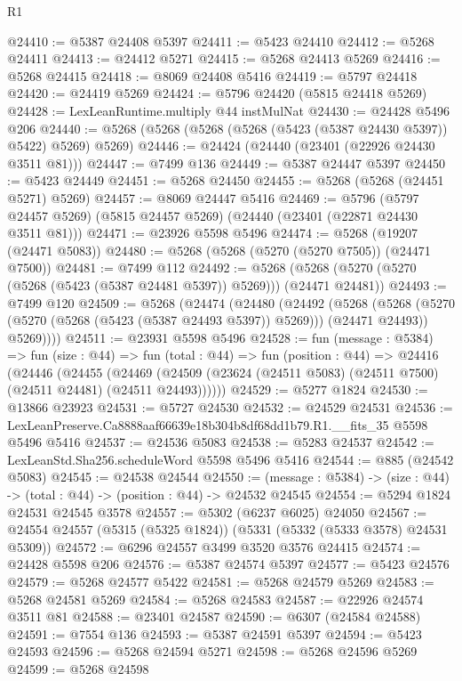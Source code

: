 \begin{lexlean}{R1}
\begin{coremodule}
@24410 := @5387 @24408 @5397
@24411 := @5423 @24410
@24412 := @5268 @24411
@24413 := @24412 @5271
@24415 := @5268 @24413 @5269
@24416 := @5268 @24415
@24418 := @8069 @24408 @5416
@24419 := @5797 @24418
@24420 := @24419 @5269
@24424 := @5796 @24420 (@5815 @24418 @5269)
@24428 := LexLeanRuntime.multiply @44 instMulNat
@24430 := @24428 @5496 @206
@24440 := @5268 (@5268 (@5268 (@5268 (@5423 (@5387 @24430 @5397)) @5422) @5269) @5269)
@24446 := @24424 (@24440 (@23401 (@22926 @24430 @3511 @81)))
@24447 := @7499 @136
@24449 := @5387 @24447 @5397
@24450 := @5423 @24449
@24451 := @5268 @24450
@24455 := @5268 (@5268 (@24451 @5271) @5269)
@24457 := @8069 @24447 @5416
@24469 := @5796
    (@5797 @24457 @5269)
    (@5815 @24457 @5269)
    (@24440 (@23401 (@22871 @24430 @3511 @81)))
@24471 := @23926 @5598 @5496
@24474 := @5268 (@19207 (@24471 @5083))
@24480 := @5268 (@5268 (@5270 (@5270 @7505)) (@24471 @7500))
@24481 := @7499 @112
@24492 := @5268 (@5268 (@5270 (@5270 (@5268 (@5423 (@5387 @24481 @5397)) @5269))) (@24471 @24481))
@24493 := @7499 @120
@24509 := @5268
    (@24474
      (@24480
        (@24492
          (@5268
            (@5268 (@5270 (@5270 (@5268 (@5423 (@5387 @24493 @5397)) @5269))) (@24471 @24493))
            @5269))))
@24511 := @23931 @5598 @5496
@24528 := fun (message : @5384) =>
  fun (size : @44) =>
  fun (total : @44) =>
  fun (position : @44) =>
  @24416
    (@24446
      (@24455
        (@24469 (@24509 (@23624 (@24511 @5083) (@24511 @7500) (@24511 @24481) (@24511 @24493))))))
@24529 := @5277 @1824
@24530 := @13866 @23923
@24531 := @5727 @24530
@24532 := @24529 @24531
@24536 := LexLeanPreserve.Ca8888aaf66639e18b304b8df68dd1b79.R1.__fits_35 @5598 @5496 @5416
@24537 := @24536 @5083
@24538 := @5283 @24537
@24542 := LexLeanStd.Sha256.scheduleWord @5598 @5496 @5416
@24544 := @885 (@24542 @5083)
@24545 := @24538 @24544
@24550 := (message : @5384) -> (size : @44) -> (total : @44) -> (position : @44) -> @24532 @24545
@24554 := @5294 @1824 @24531 @24545 @3578
@24557 := @5302 (@6237 @6025) @24050
@24567 := @24554 @24557 (@5315 (@5325 @1824)) (@5331 (@5332 (@5333 @3578) @24531 @5309))
@24572 := @6296 @24557 @3499 @3520 @3576 @24415
@24574 := @24428 @5598 @206
@24576 := @5387 @24574 @5397
@24577 := @5423 @24576
@24579 := @5268 @24577 @5422
@24581 := @5268 @24579 @5269
@24583 := @5268 @24581 @5269
@24584 := @5268 @24583
@24587 := @22926 @24574 @3511 @81
@24588 := @23401 @24587
@24590 := @6307 (@24584 @24588)
@24591 := @7554 @136
@24593 := @5387 @24591 @5397
@24594 := @5423 @24593
@24596 := @5268 @24594 @5271
@24598 := @5268 @24596 @5269
@24599 := @5268 @24598

\end{coremodule}
\end{lexlean}
